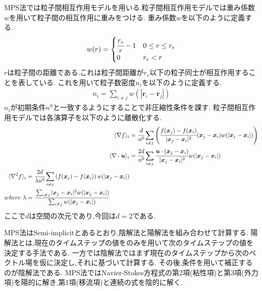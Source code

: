 MPS法では粒子間相互作用モデルを用いる.粒子間相互作用モデルでは重み係数$w$を用いて粒子間の相互作用に重みをつける.
重み係数$w$を以下のように定義する.\cite{sibas}\cite{MPSriron}
\begin{align}
    w(r)=\begin{cases}
        \cfrac{r_e}{r}-1&0\leq r\leq r_e\\
        0&r_e<r
    \end{cases}
\end{align}
$r$は粒子間の距離である.これは粒子間距離が$r_e$以下の粒子同士が相互作用することを表している.
これを用いて粒子数密度$n_i$を以下のように定義する.
\begin{align}
    n_i=\sum_{i\neq j}w(|\bm{r}_i-\bm{r}_j|)
\end{align}
$n_i$が初期条件$n^0$と一致するようにすることで非圧縮性条件を課す.
粒子間相互作用モデルでは各演算子を以下のように離散化する.\cite{soba}
\begin{align}
    \label{grad}
    \langle\nabla f\rangle_i&=\cfrac{d}{n^0}\sum_{i\neq j}\left(\cfrac{f(\bm{x}_j)-f(\bm{x}_i)}{|\bm{x}_j-\bm{x}_i|^2}(\bm{x}_j-\bm{x}_i)w(|\bm{x}_j-\bm{x}_i|)\right)\\
    \label{div}
    \langle\nabla\cdot \bm{u}\rangle_i&=\cfrac{2d}{n^0}\sum_{i\neq j}\cfrac{\bm{u}\cdot(\bm{x}_j-\bm{x}_i)}{|\bm{x}_j-\bm{x}_i|^2}w(|\bm{x}_j-\bm{x}_i|)\\
    \label{lap}
    \begin{split}
        \langle\nabla^2 f\rangle_i&=\cfrac{2d}{\lambda n^0}\sum_{i\neq j}\left(f(\bm{x}_j)-f(\bm{x}_i)\right)w(|\bm{x}_j-\bm{x}_i|)\\
        where~\lambda&=\cfrac{\sum_{i\neq j}|\bm{x}_j-\bm{x}_i|^2w(|\bm{x}_j-\bm{x}_i|)}{\sum_{i\neq j}w(|\bm{x}_j-\bm{x}_i|)}
    \end{split}
\end{align}
ここで$d$は空間の次元であり,今回は$d=2$である.

MPS法はSemi-implicitとあるとおり,陰解法と陽解法を組み合わせて計算する.
陽解法とは,現在のタイムステップの値をのみを用いて次のタイムステップの値を決定する手法である.
一方では陰解法ではまず現在のタイムステップから次のベクトル場を仮に決定し,それに基づいて計算する.
その後,条件を用いて補正するのが陰解法である.
MPS法ではNavier-Stokes方程式の第2項(粘性項)と第3項(外力項)を陽的に解き,第1項(移流項)と連続の式を陰的に解く.

